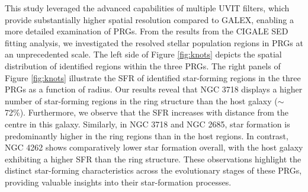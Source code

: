 \documentclass{pas}
\begin{document}
{This study leveraged the advanced capabilities of multiple UVIT filters, which provide substantially higher spatial resolution compared to GALEX, enabling a more detailed examination of PRGs. From the results from the CIGALE SED fitting analysis, we investigated the resolved stellar population regions in PRGs at an unprecedented scale. The left side of Figure \ref{fig:knots} depicts the spatial distribution of identified regions within the three PRGs. The right panels of Figure \ref{fig:knots} illustrate the SFR of identified star-forming regions in the three PRGs as a function of radius. Our results reveal that NGC 3718 displays a higher number of star-forming regions in the ring structure than the host galaxy ($\sim$72\%). Furthermore, we observe that the SFR increases with distance from the centre in this galaxy.  Similarly, in NGC 3718 and NGC 2685, star formation is predominantly higher in the ring regions than in the host regions. In contrast, NGC 4262 shows comparatively lower star formation overall, with the host galaxy exhibiting a higher SFR than the ring structure. These observations highlight the distinct star-forming characteristics across the evolutionary stages of these PRGs, providing valuable insights into their star-formation processes.}
\end{document}

